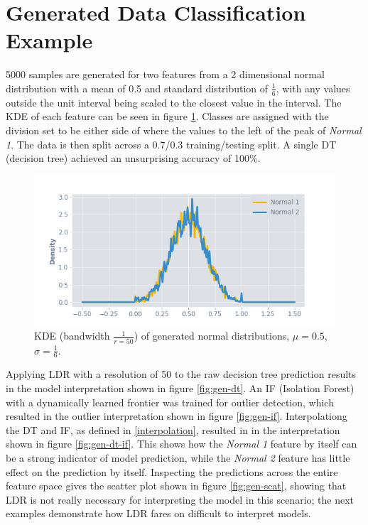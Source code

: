\documentclass[a4paper, twocolumn]{article}
\begin{document}
\section{Generated Data Classification Example}

5000 samples are generated for two features from a 2 dimensional normal distribution with a mean of 0.5 and standard distribution of $\frac{1}{6}$, with any values outside the unit interval being scaled to the closest value in the interval. The KDE of each feature can be seen in figure \ref{fig:gen-kde}. Classes are assigned with the division set to be either side of where the values to the left of the peak of \textit{Normal 1}. The data is then split across a 0.7/0.3 training/testing split. A single DT (decision tree) achieved an unsurprising accuracy of 100\%. 

\begin{figure}
\centering
\includegraphics[width=0.8\columnwidth]{img/gen_kde.png}
\caption{KDE (bandwidth $\frac{1}{r = 50}$) of generated normal distributions, $\mu = 0.5$, $\sigma = \frac{1}{6}$.}
\label{fig:gen-kde}
\end{figure}

Applying LDR with a resolution of 50 to the raw decision tree prediction results in the model interpretation shown in figure \ref{fig:gen-dt}. An IF (Isolation Forest) \cite{liu2008isolation} with a dynamically learned frontier was trained for outlier detection, which resulted in the outlier interpretation shown in figure \ref{fig:gen-if}. Interpolationg the DT and IF, as defined in \ref{interpolation}, resulted in in the interpretation shown in figure \ref{fig:gen-dt-if}. This shows how the \textit{Normal 1} feature by itself can be a strong indicator of model prediction, while the \textit{Normal 2} feature has little effect on the prediction by itself. Inspecting the predictions across the entire feature space gives the scatter plot shown in figure \ref{fig:gen-scat}, showing that LDR is not really necessary for interpreting the model in this scenario; the next examples demonstrate how LDR fares on difficult to interpret models.
\end{document}
